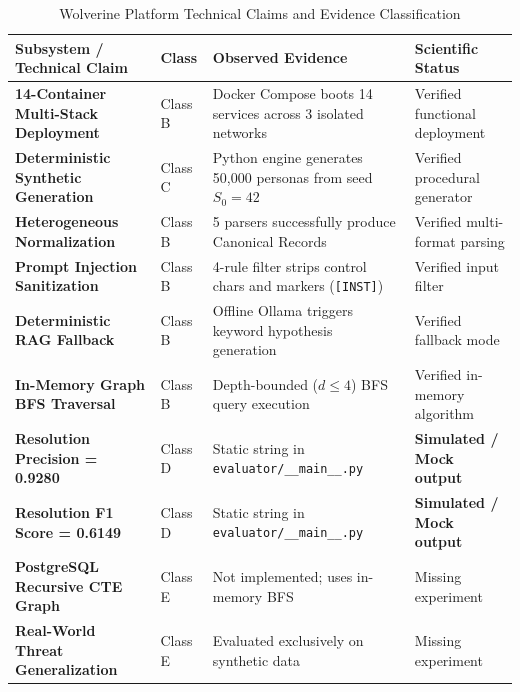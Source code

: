 \begin{table}[htbp]
\centering
\small
\caption{Wolverine Platform Technical Claims and Evidence Classification}
\label{tab:evidence-classification}
\begin{tabular}{@{}p{4.2cm}lp{4.2cm}p{3.2cm}@{}}
\toprule
\textbf{Subsystem / Technical Claim} & \textbf{Class} & \textbf{Observed Evidence} & \textbf{Scientific Status} \\ \midrule
\textbf{14-Container Multi-Stack Deployment} & Class B & Docker Compose boots 14 services across 3 isolated networks & Verified functional deployment \\ \addlinespace
\textbf{Deterministic Synthetic Generation} & Class C & Python engine generates 50,000 personas from seed $S_0 = 42$ & Verified procedural generator \\ \addlinespace
\textbf{Heterogeneous Normalization} & Class B & 5 parsers successfully produce Canonical Records & Verified multi-format parsing \\ \addlinespace
\textbf{Prompt Injection Sanitization} & Class B & 4-rule filter strips control chars and markers (\texttt{[INST]}) & Verified input filter \\ \addlinespace
\textbf{Deterministic RAG Fallback} & Class B & Offline Ollama triggers keyword hypothesis generation & Verified fallback mode \\ \addlinespace
\textbf{In-Memory Graph BFS Traversal} & Class B & Depth-bounded ($d \le 4$) BFS query execution & Verified in-memory algorithm \\ \addlinespace
\textbf{Resolution Precision = 0.9280} & Class D & Static string in \texttt{evaluator/\_\_main\_\_.py} & \textbf{Simulated / Mock output} \\ \addlinespace
\textbf{Resolution F1 Score = 0.6149} & Class D & Static string in \texttt{evaluator/\_\_main\_\_.py} & \textbf{Simulated / Mock output} \\ \addlinespace
\textbf{PostgreSQL Recursive CTE Graph} & Class E & Not implemented; uses in-memory BFS & Missing experiment \\ \addlinespace
\textbf{Real-World Threat Generalization} & Class E & Evaluated exclusively on synthetic data & Missing experiment \\ \bottomrule
\end{tabular}
\end{table}

